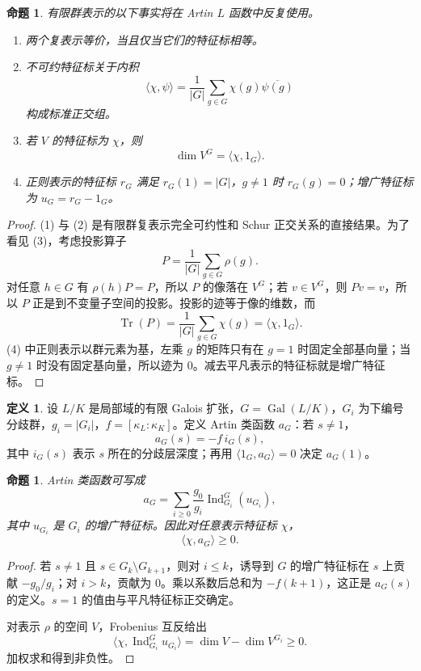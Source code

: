 \documentclass[11pt,a4paper,openany]{ctexbook}
\numberwithin{equation}{chapter}
\newcommand{\Gal}{\operatorname{Gal}}
\theoremstyle{plain}
\newtheorem{proposition}[theorem]{命题}
\theoremstyle{definition}
\newtheorem{definition}[theorem]{定义}
\theoremstyle{remark}
\begin{document}
\begin{proposition}
有限群表示的以下事实将在 Artin $L$ 函数中反复使用。
\begin{enumerate}[label=(\arabic*)]
\item 两个复表示等价，当且仅当它们的特征标相等。
\item 不可约特征标关于内积
\[
  \langle \chi,\psi\rangle=\frac1{|G|}\sum_{g\in G}\chi(g)\overline{\psi(g)}
\]
构成标准正交组。
\item 若 $V$ 的特征标为 $\chi$，则
\[
  \dim V^G=\langle \chi,1_G\rangle .
\]
\item 正则表示的特征标 $r_G$ 满足 $r_G(1)=|G|$，$g\ne1$ 时 $r_G(g)=0$；增广特征标为
$u_G=r_G-1_G$。
\end{enumerate}
\end{proposition}

\begin{proof}
(1) 与 (2) 是有限群复表示完全可约性和 Schur 正交关系的直接结果。为了看见
(3)，考虑投影算子
\[
  P=\frac1{|G|}\sum_{g\in G}\rho(g).
\]
对任意 $h\in G$ 有 $\rho(h)P=P$，所以 $P$ 的像落在 $V^G$；若 $v\in V^G$，则
$Pv=v$，所以 $P$ 正是到不变量子空间的投影。投影的迹等于像的维数，而
\[
  \operatorname{Tr}(P)=\frac1{|G|}\sum_{g\in G}\chi(g)=\langle\chi,1_G\rangle .
\]
(4) 中正则表示以群元素为基，左乘 $g$ 的矩阵只有在 $g=1$ 时固定全部基向量；当
$g\ne1$ 时没有固定基向量，所以迹为 $0$。减去平凡表示的特征标就是增广特征标。
\end{proof}

\begin{definition}
设 $L/K$ 是局部域的有限 Galois 扩张，$G=\Gal(L/K)$，$G_i$ 为下编号分歧群，$g_i=|G_i|$，$f=[\kappa_L:\kappa_K]$。定义 Artin 类函数 $a_G$：若 $s\ne1$，
\[
  a_G(s)=-f\,i_G(s),
\]
其中 $i_G(s)$ 表示 $s$ 所在的分歧层深度；再用 $\langle 1_G,a_G\rangle=0$ 决定 $a_G(1)$。
\end{definition}

\begin{proposition}
Artin 类函数可写成
\[
  a_G=\sum_{i\ge0}\frac{g_0}{g_i}\operatorname{Ind}_{G_i}^{G}(u_{G_i}),
\]
其中 $u_{G_i}$ 是 $G_i$ 的增广特征标。因此对任意表示特征标 $\chi$，
\[
  \langle \chi,a_G\rangle\ge0.
\]
\end{proposition}

\begin{proof}
若 $s\ne1$ 且 $s\in G_k\setminus G_{k+1}$，则对 $i\le k$，诱导到 $G$ 的增广特征标在 $s$ 上贡献 $-g_0/g_i$；对 $i>k$，贡献为 $0$。乘以系数后总和为 $-f(k+1)$，这正是 $a_G(s)$ 的定义。$s=1$ 的值由与平凡特征标正交确定。

对表示 $\rho$ 的空间 $V$，Frobenius 互反给出
\[
  \langle \chi,\operatorname{Ind}_{G_i}^{G}u_{G_i}\rangle
  =
  \dim V-\dim V^{G_i}\ge0.
\]
加权求和得到非负性。
\end{proof}
\end{document}
